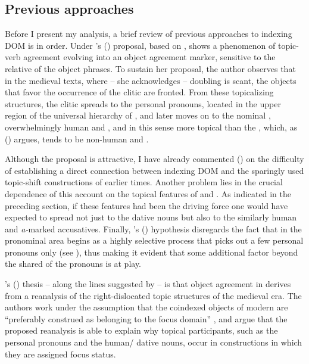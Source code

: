 \documentclass[output=paper]{LSP/langsci}
\begin{document}
\subsection{Previous approaches}\label{04-me-sec:4.2}

Before I present my analysis, a brief review of previous approaches to  indexing DOM is in order. Under \citeauthor{Silva-Corvalan1984Semantic}'s (\citeyear{Silva-Corvalan1984Semantic}) proposal, based on \citet{Givon1976Topic},   shows a phenomenon of topic-verb agreement evolving into an object agreement marker, sensitive to the relative  of the object phrases. To sustain her proposal, the author observes that in the medieval texts, where – she acknowledges – doubling is scant, the objects that favor the occurrence of the clitic are fronted. From these topicalizing structures, the clitic spreads to the personal pronouns, located in the upper region of the universal hierarchy of , and later moves on to the nominal , overwhelmingly human and , and in this sense more topical than the , which, as \citeauthor{Silva-Corvalan1984Semantic} (\citeyear{Silva-Corvalan1984Semantic}) argues, tends to be non-human and .

 Although the proposal is attractive, I have already commented () on the difficulty of establishing a direct connection between indexing DOM and the sparingly used topic-shift constructions of earlier times. Another problem lies in the crucial dependence of this account on the topical features of  and . As indicated in the preceding section, if these features had been the driving force one would have expected  to spread not just to the dative nouns but also to the similarly human and  \textit{a-}marked accusatives. Finally, \citeauthor{Silva-Corvalan1984Semantic}’s (\citeyear{Silva-Corvalan1984Semantic})  hypothesis disregards the fact that  in the pronominal area begins as a highly selective process that picks out a few personal pronouns only (see ), thus making it evident that some additional factor beyond the shared  of the pronouns is at play.

\citeauthor{Gabrieletal2010Information}'s (\citeyear{Gabrieletal2010Information}) thesis – along the lines suggested by \citet{Givon1976Topic} – is that object agreement in  derives from a reanalysis of the right-dislocated topic structures of the medieval era. The authors work under the assumption that the coindexed objects of modern  are “preferably construed as belonging to the focus domain” \citep[62]{Gabrieletal2010Information}, and argue that the proposed reanalysis is able to explain why topical participants, such as the personal pronouns and the human/ dative nouns, occur in  constructions in which they are assigned focus status.
\end{document}
